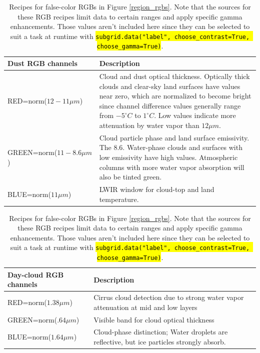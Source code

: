 \documentclass[12pt]{article}
\newcommand{\hltexttt}[1]{\texttt{\hl{#1}}}
\begin{document}
\begin{table}[h!]
    \begin{center}
        \renewcommand{\arraystretch}{1.3}
        \begin{tabular}{ l m{10cm} }
            \textbf{Dust RGB channels} & \textbf{Description} \\\hline

            RED=norm($12-11\mu m$) & Cloud and dust optical thickness. Optically thick clouds and clear-sky land surfaces have values near zero, which are normalized to become bright since channel difference values generally range from $-5^\circ C$ to $1^\circ C$. Low values indicate more attenuation by water vapor than $12\mu m$. \\
            GREEN=norm($11-8.6\mu m$) & Cloud particle phase and land surface emissivity. The $8.6$. Water-phase clouds and surfaces with low emissivity have high values. Atmospheric columns with more water vapor absorption will also be tinted green. \\
            BLUE=norm($11\mu m$) & LWIR window for cloud-top and land temperature. \\
        \end{tabular}

        \vspace{.9em}

        \begin{tabular}{ l m{10cm} }
            \textbf{Day-cloud RGB channels} & \textbf{Description} \\\hline

            RED=norm($1.38\mu m$) & Cirrus cloud detection due to strong water vapor attenuation at mid and low layers \\
            GREEN=norm($.64\mu m$) & Visible band for cloud optical thickness \\
            BLUE=norm($1.64\mu m$) & Cloud-phase distinction; Water droplets are reflective, but ice particles strongly absorb. \\
        \end{tabular}
    \end{center}
    \caption{Recipes for false-color RGBs in Figure \ref{region_rgbs}. Note that the sources for these RGB recipes limit data to certain ranges and apply specific gamma enhancements. Those values aren't included here since they can be selected to suit a task at runtime with \hltexttt{subgrid.data("label", choose\_contrast=True, choose\_gamma=True)}.}
    \label{rgb_recipes}
\end{table}
\end{document}
